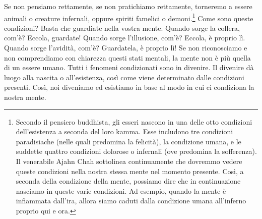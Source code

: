 Se non pensiamo rettamente, se non pratichiamo rettamente, torneremo a
essere animali o creature infernali, oppure spiriti famelici o
demoni.\footnote{Secondo il pensiero buddhista, gli esseri nascono in
  una delle otto condizioni dell'esistenza a seconda del loro
  kamma. Esse includono tre condizioni paradisiache (nelle quali
  predomina la felicità), la condizione umana, e le suddette quattro
  condizioni dolorose o infernali (ove predomina la sofferenza). Il
  venerabile Ajahn Chah sottolinea continuamente che dovremmo vedere
  queste condizioni nella nostra stessa mente nel momento presente.
  Così, a seconda della condizione della mente, possiamo dire che in
  continuazione nasciamo in queste varie condizioni. Ad esempio, quando
  la mente è infiammata dall'ira, allora siamo caduti dalla condizione
  umana all'inferno proprio qui e ora.} Come sono queste condizioni?
Basta che guardiate nella vostra mente. Quando sorge la collera, com'è?
Eccola, guardate! Quando sorge l'illusione, com'è? Eccola, è proprio lì.
Quando sorge l'avidità, com'è? Guardatela, è proprio lì! Se non
riconosciamo e non comprendiamo con chiarezza questi stati mentali, la
mente non è più quella di un essere umano. Tutti i fenomeni condizionati
sono in divenire. Il divenire dà luogo alla nascita o all'esistenza,
così come viene determinato dalle condizioni presenti. Così, noi
diveniamo ed esistiamo in base al modo in cui ci condiziona la nostra
mente.

